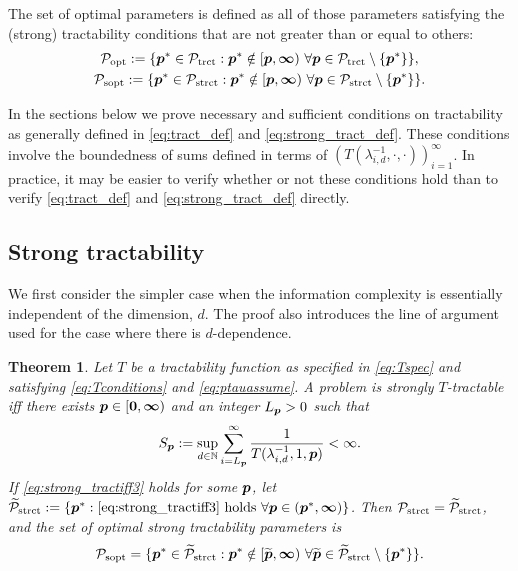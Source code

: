 \documentclass[sort&compress]{elsarticle}
\newcommand{\peter}[1]{\begingroup\color{violet}#1\endgroup}
\newtheorem{theorem}{Theorem}
\begin{document}
\begin{definition}
    The  set of optimal parameters is defined as all of those parameters satisfying the (strong) tractability conditions that are not greater than or equal to others:
\begin{gather}
	\label{eq:Poptdef}
	\mathcal{P}_{\textup{opt}} : = \{\boldsymbol{p}^* \in \mathcal{P}_{\textup{trct}} :  \boldsymbol{p}^* \notin [\boldsymbol{p},\boldsymbol{\infty}) \ \forall \boldsymbol{p} \in  \mathcal{P}_{\textup{trct}} \setminus \{\boldsymbol{p}^*\} \}, \\
	\label{eq:Psoptdef}
	\mathcal{P}_{\textup{sopt}} : = \{\boldsymbol{p}^* \in \mathcal{P}_{\textup{strct}} :  \boldsymbol{p}^* \notin [\boldsymbol{p},\boldsymbol{\infty}) \ \forall \boldsymbol{p} \in  \mathcal{P}_{\textup{strct}} \setminus \{\boldsymbol{p}^*\} \}.
\end{gather}
\end{definition}


In the sections below we prove necessary and sufficient conditions on tractability as generally defined in \eqref{eq:tract_def} and \eqref{eq:strong_tract_def}.  These conditions involve the boundedness of sums defined in terms of $(T(\lambda_{i,d}^{-1},\cdot, \cdot))_{i=1}^\infty$.  In practice, it may be easier to verify whether or not these conditions hold than to verify \eqref{eq:tract_def} and \eqref{eq:strong_tract_def} directly.




\subsection{Strong tractability}

We first consider the simpler case when the \peter{information} complexity is essentially independent of the dimension, $d$.  The proof also introduces the line of argument used for the case where there is $d$-dependence.

\begin{theorem}\label{thm_main_strong_tract2}
Let $T$ be a tractability function as specified in \eqref{eq:Tspec} and satisfying \eqref{eq:Tconditions} and \eqref{eq:ptauassume}.  A problem is strongly $T$-tractable iff there exists $\boldsymbol{p} \in [\boldsymbol{0}, \boldsymbol{\infty})$ and an integer $L_{\boldsymbol{p}} > 0$ such that
\begin{equation} \label{eq:strong_tractiff3}
     S_{\boldsymbol{p}}:=\sup_{d \in \mathbb{N}} \sum_{i = L_{\boldsymbol{p}}}^\infty \frac{1}{T(\lambda_{i,d}^{-1},1,\boldsymbol{p})} < \infty.
\end{equation}
If \eqref{eq:strong_tractiff3} holds for some $\boldsymbol{p}$, let  $\widetilde{\mathcal{P}}_{\textup{strct}} : = \{\boldsymbol{p}^* : \eqref{eq:strong_tractiff3} \text{ holds }\forall \boldsymbol{p} \in (\boldsymbol{p}^*,\boldsymbol{\infty})\}$.  Then $\mathcal{P}_{\textup{strct}} = \widetilde{\mathcal{P}}_{\textup{strct}}$, and the set of optimal strong tractability parameters is
\[
	\mathcal{P}_{\textup{sopt}} =
	\{\boldsymbol{p}^* \in \widetilde{\mathcal{P}}_{\textup{strct}} :  \boldsymbol{p}^* \notin [\widetilde{\boldsymbol{p}},\boldsymbol{\infty}) \ \forall \widetilde{\boldsymbol{p}}\in  \widetilde{\mathcal{P}}_{\textup{strct}} \setminus \{\boldsymbol{p}^*\} \}.
\]
\end{theorem}
\end{document}
